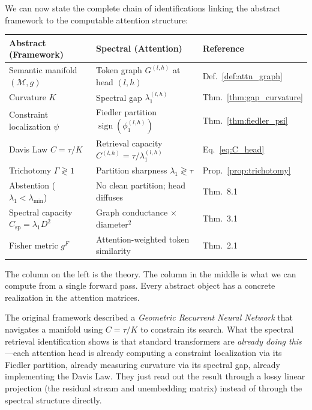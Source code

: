 \documentclass[11pt]{article}
\theoremstyle{remark}
\newcommand{\Mman}{(\mathcal{M}, g)}
\newcommand{\Csp}{C_{\mathrm{sp}}}
\DeclareMathOperator{\sign}{sign}
\begin{document}
We can now state the complete chain of identifications linking 
the abstract framework to the computable attention structure:

\begin{center}
\begin{tabular}{lll}
\toprule
\textbf{Abstract (Framework)} & \textbf{Spectral (Attention)} 
  & \textbf{Reference} \\
\midrule
Semantic manifold $\Mman$ & Token graph $G^{(l,h)}$ 
  at head $(l,h)$ & Def.~\ref{def:attn_graph} \\
Curvature $K$ & Spectral gap $\lambda_1^{(l,h)}$ 
  & Thm.~\ref{thm:gap_curvature} \\
Constraint localization $\psi$ & Fiedler partition 
  $\sign(\phi_1^{(l,h)})$ & Thm.~\ref{thm:fiedler_psi} \\
Davis Law $C = \tau/K$ & Retrieval capacity 
  $C^{(l,h)} = \tau / \lambda_1^{(l,h)}$ 
  & Eq.~\eqref{eq:C_head} \\
Trichotomy $\Gamma \gtrless 1$ & Partition sharpness 
  $\lambda_1 \gtrless \tau$ & Prop.~\ref{prop:trichotomy} \\
Abstention ($\lambda_1 < \lambda_{\min}$) & No clean 
  partition; head diffuses & \cite{davis2026geodesic} 
  Thm.~8.1 \\
Spectral capacity $\Csp = \lambda_1 D^2$ & Graph 
  conductance $\times$ diameter$^2$ 
  & \cite{davis2026spectral} Thm.~3.1 \\
Fisher metric $g^F$ & Attention-weighted token 
  similarity & \cite{davis2026info} Thm.~2.1 \\
\bottomrule
\end{tabular}
\end{center}

\medskip

The column on the left is the theory. The column in the 
middle is what we can compute from a single forward pass. 
Every abstract object has a concrete realization in the 
attention matrices.

The original framework described a \emph{Geometric Recurrent 
Neural Network} that navigates a manifold using $C = \tau/K$ 
to constrain its search. What the spectral retrieval 
identification shows is that standard transformers are 
\emph{already doing this}---each attention head is already 
computing a constraint localization via its Fiedler partition, 
already measuring curvature via its spectral gap, already 
implementing the Davis Law. They just read out the result 
through a lossy linear projection (the residual stream and 
unembedding matrix) instead of through the spectral structure 
directly.
\end{document}
